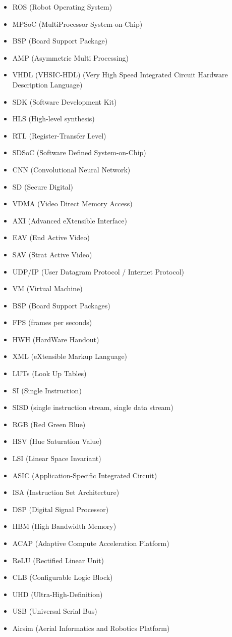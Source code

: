 \begin{multicols}{2}
\begin{itemize}
    \item ROS (Robot Operating System)
    \item MPSoC (MultiProcessor System-on-Chip)
    \item BSP (Board Support Package)
    \item AMP (Asymmetric Multi Processing)
    \item VHDL (VHSIC-HDL) (Very High Speed Integrated Circuit Hardware Description Language)
    \item SDK (Software Development Kit)
    \item HLS (High-level synthesis)
    \item RTL (Register-Transfer Level)
    \item SDSoC (Software Defined System-on-Chip)
    \item CNN (Convolutional Neural Network)
    \item SD (Secure Digital)
    \item VDMA (Video Direct Memory Access)
    \item AXI (Advanced eXtensible Interface)
    \item EAV (End Active Video)
    \item SAV (Strat Active Video)
    \item UDP/IP (User Datagram Protocol / Internet Protocol)
    \item VM (Virtual Machine)
    \item BSP (Board Support Packages)
    \item FPS (frames per seconds)
    \item HWH (HardWare Handout)
    \item XML (eXtensible Markup Language)
    \item LUTs (Look Up Tables)
    \item SI (Single Instruction)
    \item SISD (single instruction stream, single data stream)
    \item RGB (Red Green Blue)
    \item HSV (Hue Saturation Value)
    \item LSI (Linear Space Invariant)
    \item ASIC (Application-Specific Integrated Circuit)
    \item ISA (Instruction Set Architecture)
    \item DSP (Digital Signal Processor)
    \item HBM (High Bandwidth Memory)
    \item ACAP (Adaptive Compute Acceleration Platform)
    \item ReLU (Rectified Linear Unit)
    \item CLB (Configurable Logic Block)
    \item UHD (Ultra-High-Definition)
    \item USB (Universal Serial Bus)
    \item Airsim (Aerial Informatics and Robotics Platform)
\end{itemize}

\end{multicols}


